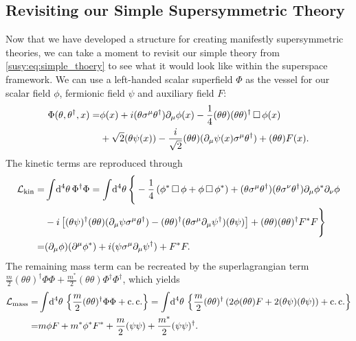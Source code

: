\documentclass[../main.tex]{subfiles}
\begin{document}
\subsection{Revisiting our Simple Supersymmetric Theory}
Now that we have developed a structure for creating manifestly supersymmetric theories, we can take a moment to revisit our simple theory from \cref{susy:eq:simple_thoery} to see what it would look like within the superspace framework.
We can use a left-handed scalar superfield \(\Phi\) as the vessel for our scalar field \(\phi\), fermionic field \(\psi\) and auxiliary field \(F\):
\begin{align}
  \nonumber
  \Phi(\theta, \theta^\dagger, x) = & \phi(x) + i(\theta\sigma^\mu \theta^\dagger) \partial_\mu \phi(x) - \frac{1}{4} (\theta\theta)(\theta\theta)^\dagger \operatorname{\Box} \phi(x)      \\
                                    & + \sqrt{2}(\theta \psi(x)) - \frac{i}{\sqrt{2}} (\theta\theta) (\partial_\mu \psi(x) \sigma^\mu \theta^\dagger) + (\theta\theta)F(x).
\end{align}
The kinetic terms are reproduced through
\begin{align}
  \nonumber
  \mathcal{L}_\text{kin} = & \int \!\mathrm{d}^4\theta\, \Phi^\dagger \Phi = \int \!\mathrm{d}^4\theta\, \Bigg\{-\frac{1}{4}\left(\phi^\ast \operatorname{\Box} \phi + \phi \operatorname{\Box} \phi^\ast\right) + (\theta \sigma^\mu \theta^\dagger)(\theta \sigma^\nu \theta^\dagger) \partial_\mu\phi^\ast \partial_\nu\phi \\
  \nonumber
                  & -i \left[(\theta \psi)^\dagger (\theta\theta) (\partial_\mu \psi \sigma^\mu \theta^\dagger) - (\theta\theta)^\dagger (\theta \sigma^\mu \partial_\mu \psi^\dagger) (\theta \psi)\right] + (\theta\theta)(\theta\theta)^\dagger F^\ast F   \Bigg\} \\
  =               & (\partial_\mu \phi) (\partial^\mu\phi^\ast) + i(\psi \sigma^\mu \partial_\mu \psi^\dagger) + F^\ast F.
\end{align}
The remaining mass term can be recreated by the superlagrangian term \(\frac{m}{2} (\theta\theta)^\dagger \Phi\Phi + \frac{m^\ast}{2} (\theta\theta) \Phi^\dagger\Phi^\dagger\), which yields
\begin{align}
  \nonumber
  \mathcal{L}_\text{mass} = & \int \!\mathrm{d}^4\theta\, \left\{\frac{m}{2} (\theta\theta)^\dagger \Phi\Phi + \operatorname{c.c.}\right\} = \int \!\mathrm{d}^4\theta\, \left\{\frac{m}{2} (\theta\theta)^\dagger \left(2\phi (\theta\theta) F + 2(\theta\psi)(\theta\psi)\right) + \operatorname{c.c.}\right\} \\
  =                & m \phi F + m^\ast \phi^\ast F^\ast + \frac{m}{2}(\psi\psi) + \frac{m^\ast}{2} (\psi\psi)^\dagger.
\end{align}
\end{document}
